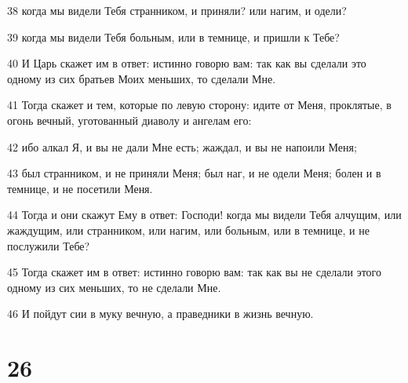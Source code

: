 \par 38 когда мы видели Тебя странником, и приняли? или нагим, и одели?
\par 39 когда мы видели Тебя больным, или в темнице, и пришли к Тебе?
\par 40 И Царь скажет им в ответ: истинно говорю вам: так как вы сделали это одному из сих братьев Моих меньших, то сделали Мне.
\par 41 Тогда скажет и тем, которые по левую сторону: идите от Меня, проклятые, в огонь вечный, уготованный диаволу и ангелам его:
\par 42 ибо алкал Я, и вы не дали Мне есть; жаждал, и вы не напоили Меня;
\par 43 был странником, и не приняли Меня; был наг, и не одели Меня; болен и в темнице, и не посетили Меня.
\par 44 Тогда и они скажут Ему в ответ: Господи! когда мы видели Тебя алчущим, или жаждущим, или странником, или нагим, или больным, или в темнице, и не послужили Тебе?
\par 45 Тогда скажет им в ответ: истинно говорю вам: так как вы не сделали этого одному из сих меньших, то не сделали Мне.
\par 46 И пойдут сии в муку вечную, а праведники в жизнь вечную.

\chapter{26}

